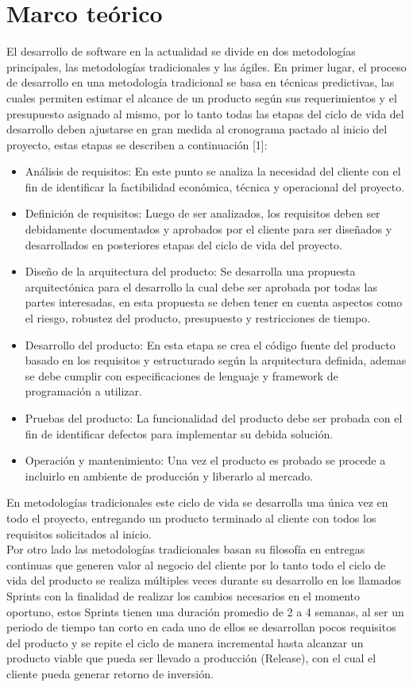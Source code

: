 \onehalfspacing
\chapter*{Marco teórico}
El desarrollo de software en la actualidad se divide en dos metodologías principales, las metodologías tradicionales y las ágiles. En primer lugar, el proceso de desarrollo en una metodología tradicional se basa en técnicas predictivas, las cuales permiten estimar el alcance de un producto según sus requerimientos y el presupuesto asignado al mismo, por lo tanto todas las etapas del ciclo de vida del desarrollo deben ajustarse en gran medida al cronograma pactado al inicio del proyecto, estas etapas se describen a continuación [1]:
\begin{itemize}
	\item Análisis de requisitos: En este punto se analiza la necesidad del cliente con el fin de identificar la factibilidad económica, técnica y operacional del proyecto.
	\item Definición de requisitos: Luego de ser analizados, los requisitos deben ser debidamente documentados y aprobados por el cliente para ser diseñados y desarrollados en posteriores etapas del ciclo de vida del proyecto.
	\item Diseño de la arquitectura del producto: Se desarrolla una propuesta arquitectónica para el desarrollo la cual debe ser aprobada por todas las partes interesadas, en esta propuesta se deben tener en cuenta aspectos como el riesgo, robustez del producto, presupuesto y restricciones de tiempo.
	\item Desarrollo del producto: En esta etapa se crea el código fuente del producto basado en los requisitos y estructurado según la arquitectura definida, ademas se debe cumplir con especificaciones de lenguaje y framework de programación a utilizar.
	\item Pruebas del producto: La funcionalidad del producto debe ser probada con el fin de identificar defectos para implementar su debida solución.
	\item Operación y mantenimiento: Una vez el producto es probado se procede a incluirlo en ambiente de producción y liberarlo al mercado.
\end{itemize}  
En metodologías tradicionales este ciclo de vida se desarrolla una única vez en todo el proyecto, entregando un producto terminado al cliente con todos los requisitos solicitados al inicio.\\

Por otro lado las metodologías tradicionales basan su filosofía en entregas continuas que generen valor al negocio del cliente por lo tanto todo el ciclo de vida del producto se realiza múltiples veces durante su desarrollo en los llamados Sprints con la finalidad de realizar los cambios necesarios en el momento oportuno, estos Sprints tienen una duración promedio de 2 a 4 semanas, al ser un periodo de tiempo tan corto en cada uno de ellos se desarrollan pocos requisitos del producto y se repite el ciclo de manera incremental hasta alcanzar un producto viable que pueda ser llevado a producción (Release), con el cual el cliente pueda generar retorno de inversión.\\

